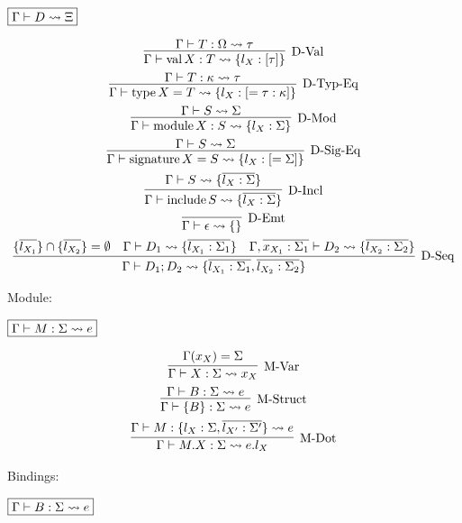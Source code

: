 $\fbox{$\Gamma \vdash D \rightsquigarrow \Xi$}$

\begin{gather*}
  \infer[\text{D-Val}]{\Gamma \vdash \symval X: T \elaborate \{l_X: [\tau]\}}{
    \Gamma \vdash T: \Omega \elaborate \tau
  }
  \\
  \infer[\text{D-Typ-Eq}]{\Gamma \vdash \symtype X = T \elaborate \{l_X: [= \tau: \kappa]\}}{
    \Gamma \vdash T: \kappa \elaborate \tau
  }
  \\
  \infer[\text{D-Mod}]{\Gamma \vdash \symmodule X: S \elaborate \{l_X: \Sigma\}}{
    \Gamma \vdash S \elaborate \Sigma
  }
  \\
  \infer[\text{D-Sig-Eq}]{\Gamma \vdash \symsignature X = S \elaborate \{l_X: [= \Sigma]\}}{
    \Gamma \vdash S \elaborate \Sigma
  }
  \\
  \infer[\text{D-Incl}]{\Gamma \vdash \syminclude S \elaborate \{\overline{l_X: \Sigma}\}}{
    \Gamma \vdash S \elaborate \{\overline{l_X: \Sigma}\}
  }
  \\
  \infer[\text{D-Emt}]{\Gamma \vdash \epsilon \elaborate \{\}}{}
  \\
  \infer[\text{D-Seq}]{\Gamma \vdash D_1; D_2 \elaborate \{\overline{l_{X_1}: \Sigma_1}, \overline{l_{X_2}: \Sigma_2}\}}{
    \{\overline{l_{X_1}}\} \cap \{\overline{l_{X_2}}\} = \emptyset
    &
    \Gamma \vdash D_1 \elaborate \{\overline{l_{X_1}: \Sigma_1}\}
    &
    \Gamma, \overline{x_{X_1}: \Sigma_1} \vdash D_2 \elaborate \{\overline{l_{X_2}: \Sigma_2}\}
  }
\end{gather*}

Module:

$\fbox{$\Gamma \vdash M: \Sigma \rightsquigarrow e$}$

\begin{gather*}
  \infer[\text{M-Var}]{\Gamma \vdash X: \Sigma \elaborate x_X}{
    \Gamma(x_X) = \Sigma
  }
  \\
  \infer[\text{M-Struct}]{\Gamma \vdash \{B\}: \Sigma \elaborate e}{
    \Gamma \vdash B: \Sigma \elaborate e
  }
  \\
  \infer[\text{M-Dot}]{\Gamma \vdash M.X: \Sigma \elaborate e.l_X}{
    \Gamma \vdash M: \{l_X: \Sigma, \overline{l_{X'}: \Sigma'}\} \elaborate e
  }
\end{gather*}

Bindings:

$\fbox{$\Gamma \vdash B: \Sigma \rightsquigarrow e$}$

